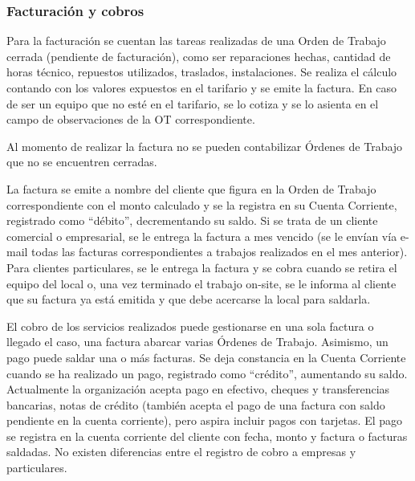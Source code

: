 \documentclass[12pt]{extarticle}
\begin{document}
\begin{spacing}{1.2}
    \subsubsection{Facturación y cobros}
    Para la facturación se cuentan las tareas realizadas de una Orden de Trabajo cerrada (pendiente de facturación), como ser reparaciones hechas, cantidad de horas técnico, repuestos utilizados, traslados, instalaciones. Se realiza el cálculo contando con los valores expuestos en el tarifario y se emite la factura. En caso de ser un equipo que no esté en el tarifario, se lo cotiza y se lo asienta en el campo de observaciones de la OT correspondiente.

    Al momento de realizar la factura no se pueden contabilizar Órdenes de Trabajo que no se encuentren cerradas.

    La factura se emite a nombre del cliente que figura en la Orden de Trabajo correspondiente con el monto calculado y se la registra en su Cuenta Corriente, registrado como ``débito'', decrementando su saldo. Si se trata de un cliente comercial o empresarial, se le entrega la factura a mes vencido (se le envían vía e-mail todas las facturas correspondientes a trabajos realizados en el mes anterior). Para clientes particulares, se le entrega la factura y se cobra cuando se retira el equipo del local o, una vez terminado el trabajo on-site, se le informa al cliente que su factura ya está emitida y que debe acercarse la local para saldarla.

    El cobro de los servicios realizados puede gestionarse en una sola factura o llegado el caso, una factura abarcar varias Órdenes de Trabajo. Asimismo, un pago puede saldar una o más facturas. Se deja constancia en la Cuenta Corriente cuando se ha realizado un pago, registrado como ``crédito'', aumentando su saldo. Actualmente la organización acepta pago en efectivo, cheques y transferencias bancarias, notas de crédito (también acepta el pago de una factura con saldo pendiente en la cuenta corriente), pero aspira incluir pagos con tarjetas. El pago se registra en la cuenta corriente del cliente con fecha, monto y factura o facturas saldadas. No existen diferencias entre el registro de cobro a empresas y particulares.\\


\end{spacing}
\end{document}
